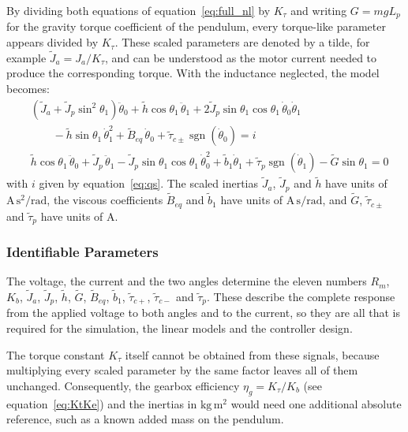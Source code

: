 \documentclass[a4paper,11pt]{article}
\newcommand{\sgn}{\operatorname{sgn}}
\begin{document}
By dividing both equations of equation~\ref{eq:full_nl} by $K_\tau$ and writing $G = m g L_p$ for the gravity torque coefficient of the pendulum, every torque-like parameter appears divided by $K_\tau$. These scaled parameters are denoted by a tilde, for example $\tilde J_a = J_a/K_\tau$, and can be understood as the motor current needed to produce the corresponding torque. With the inductance neglected, the model becomes:
\begin{equation}
\boxed{
\begin{aligned}
  & \left(\tilde J_a + \tilde J_p \sin^2\theta_1\right)\ddot\theta_0 + \tilde h \cos\theta_1\, \ddot\theta_1 + 2 \tilde J_p \sin\theta_1 \cos\theta_1\, \dot\theta_0 \dot\theta_1\\
  & \qquad - \tilde h \sin\theta_1\, \dot\theta_1^2 + \tilde B_{eq}\, \dot\theta_0 + \tilde\tau_{c\pm} \sgn(\dot\theta_0) = i\\[4pt]
  & \tilde h \cos\theta_1\, \ddot\theta_0 + \tilde J_p\, \ddot\theta_1 - \tilde J_p \sin\theta_1 \cos\theta_1\, \dot\theta_0^2 + \tilde b_1 \dot\theta_1 + \tilde\tau_p \sgn(\dot\theta_1) - \tilde G \sin\theta_1 = 0
\end{aligned}
}
\label{eq:scaled}
\end{equation}
with $i$ given by equation~\ref{eq:qs}. The scaled inertias $\tilde J_a$, $\tilde J_p$ and $\tilde h$ have units of $\mathrm{A\,s^2/rad}$, the viscous coefficients $\tilde B_{eq}$ and $\tilde b_1$ have units of $\mathrm{A\,s/rad}$, and $\tilde G$, $\tilde\tau_{c\pm}$ and $\tilde\tau_p$ have units of $\mathrm{A}$.

\subsubsection{Identifiable Parameters}
The voltage, the current and the two angles determine the eleven numbers $R_m$, $K_b$, $\tilde J_a$, $\tilde J_p$, $\tilde h$, $\tilde G$, $\tilde B_{eq}$, $\tilde b_1$, $\tilde\tau_{c+}$, $\tilde\tau_{c-}$ and $\tilde\tau_p$. These describe the complete response from the applied voltage to both angles and to the current, so they are all that is required for the simulation, the linear models and the controller design.

The torque constant $K_\tau$ itself cannot be obtained from these signals, because multiplying every scaled parameter by the same factor leaves all of them unchanged. Consequently, the gearbox efficiency $\eta_g = K_\tau / K_b$ (see equation~\ref{eq:KtKe}) and the inertias in $\mathrm{kg\,m^2}$ would need one additional absolute reference, such as a known added mass on the pendulum.
\end{document}
